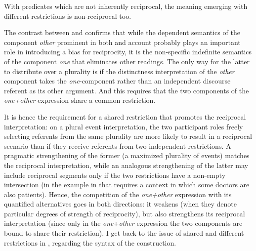 \documentclass[output=paper,colorlinks,citecolor=brown]{langscibook}
\begin{document}
\noindent With predicates which are not inherently reciprocal, the meaning emerging with different restrictions is non-reciprocal too.

\ea\label{ex:Lekari}
\label{ex:Lekari-a}
\label{ex:Lekari-b}
\label{ex:Lekari-c}
 \z \z
 
\noindent The contrast between  and  confirms that while the dependent semantics of the component \textit{other} prominent in both  and  account probably plays an important role in introducing a bias for reciprocity, it is the non-specific indefinite semantics of the component \textit{one} that eliminates other readings. The only way for the latter to distribute over a plurality is if the distinctness interpretation of the \textit{other} component takes the \textit{one}-component rather than an independent discourse referent as its other argument. And this requires that the two components of the \textit{one+other} expression share a common restriction.

It is hence the requirement for a shared restriction that promotes the reciprocal interpretation: on a plural event interpretation, the two participant roles freely selecting referents from the same plurality are more likely to result in a reciprocal scenario than if they receive referents from two independent restrictions. A pragmatic strengthening of the former (a maximized plurality of events) matches the reciprocal interpretation, while an analogous strengthening of the latter may include reciprocal segments only if the two restrictions have a non-empty intersection (in the example in  that requires a context in which some doctors are also patients). Hence, the competition of the \textit{one+other} expression with its quantified alternatives goes in both directions: it weakens (when they denote particular degrees of strength of reciprocity), but also strengthens its reciprocal interpretation (since only in the \textit{one}+\textit{other} expression the two components are bound to share their restriction). I get back to the issue of shared and different restrictions in , regarding the syntax of the construction.
\end{document}

